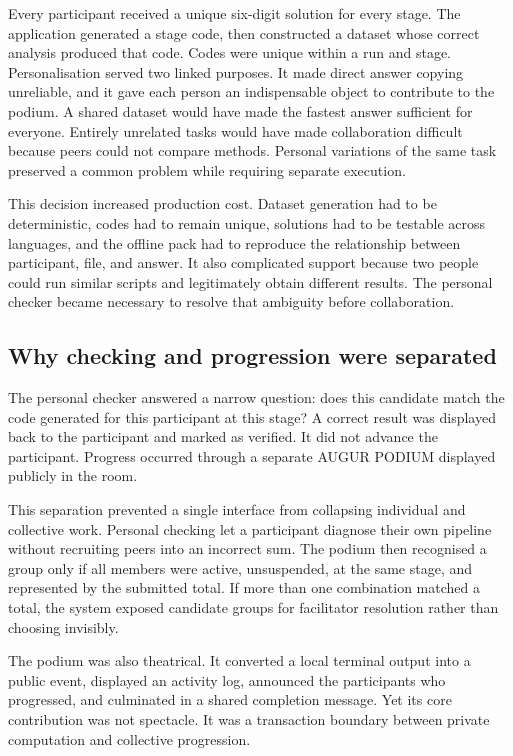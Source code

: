 \documentclass[11pt,a4paper]{article}
\begin{document}
Every participant received a unique six-digit solution for every stage. The application generated a stage code, then constructed a dataset whose correct analysis produced that code. Codes were unique within a run and stage. Personalisation served two linked purposes. It made direct answer copying unreliable, and it gave each person an indispensable object to contribute to the podium. A shared dataset would have made the fastest answer sufficient for everyone. Entirely unrelated tasks would have made collaboration difficult because peers could not compare methods. Personal variations of the same task preserved a common problem while requiring separate execution.

This decision increased production cost. Dataset generation had to be deterministic, codes had to remain unique, solutions had to be testable across languages, and the offline pack had to reproduce the relationship between participant, file, and answer. It also complicated support because two people could run similar scripts and legitimately obtain different results. The personal checker became necessary to resolve that ambiguity before collaboration.

\subsection{Why checking and progression were separated}

The personal checker answered a narrow question: does this candidate match the code generated for this participant at this stage? A correct result was displayed back to the participant and marked as verified. It did not advance the participant. Progress occurred through a separate AUGUR PODIUM displayed publicly in the room.

This separation prevented a single interface from collapsing individual and collective work. Personal checking let a participant diagnose their own pipeline without recruiting peers into an incorrect sum. The podium then recognised a group only if all members were active, unsuspended, at the same stage, and represented by the submitted total. If more than one combination matched a total, the system exposed candidate groups for facilitator resolution rather than choosing invisibly.

The podium was also theatrical. It converted a local terminal output into a public event, displayed an activity log, announced the participants who progressed, and culminated in a shared completion message. Yet its core contribution was not spectacle. It was a transaction boundary between private computation and collective progression.
\end{document}
